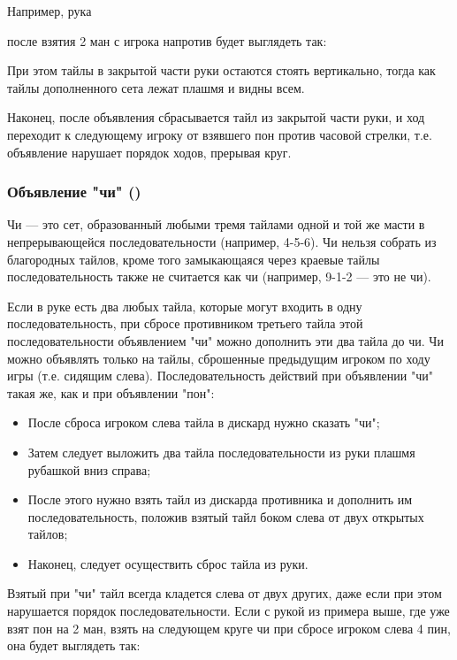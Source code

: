 
Например, рука


после взятия 2 ман с игрока напротив будет выглядеть так:

 \hfill {}

При этом тайлы в закрытой части руки остаются стоять вертикально, тогда как тайлы дополненного сета лежат плашмя и видны всем.

Наконец, после объявления сбрасывается тайл из закрытой части руки, и ход переходит к следующему игроку от взявшего пон против часовой стрелки, т.е. объявление нарушает порядок ходов, прерывая круг.

\subsubsection{Объявление "чи" ()}

Чи --- это сет, образованный любыми тремя тайлами одной и той же масти в непрерывающейся последовательности (например, 4-5-6). Чи нельзя собрать из благородных тайлов, кроме того замыкающаяся через краевые тайлы последовательность также не считается как чи (например, 9-1-2 --- это не чи).

Если в руке есть два любых тайла, которые могут входить в одну последовательность, при сбросе противником третьего тайла этой последовательности объявлением "чи" можно дополнить эти два тайла до чи. Чи можно объявлять только на тайлы, сброшенные предыдущим игроком по ходу игры (т.е. сидящим слева). Последовательность действий при объявлении "чи" такая же, как и при объявлении "пон":

\begin{itemize}
	\item После сброса игроком слева тайла в дискард нужно сказать "чи";
	\item Затем следует выложить два тайла последовательности из руки плашмя рубашкой вниз справа;
	\item После этого нужно взять тайл из дискарда противника и дополнить им последовательность, положив взятый тайл боком слева от двух открытых тайлов;
	\item Наконец, следует осуществить сброс тайла из руки.
\end{itemize}

Взятый при "чи" тайл всегда кладется слева от двух других, даже если при этом нарушается порядок последовательности. Если с рукой из примера выше, где уже взят пон на 2 ман, взять на следующем круге чи при сбросе игроком слева 4 пин, она будет выглядеть так:

